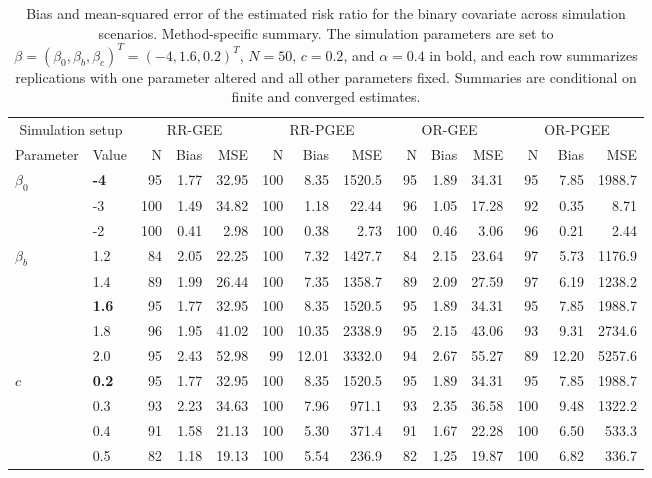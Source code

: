 \begin{table}[htbp]
\centering
\scriptsize
\setlength{\tabcolsep}{4pt}
\renewcommand{\arraystretch}{1.15}
\caption{Bias and mean-squared error of the estimated risk ratio for the binary covariate across simulation scenarios. Method-specific summary. The simulation parameters are set to $\beta = (\beta_0, \beta_b, \beta_c)^T = (-4, 1.6, 0.2)^T$, $N = 50$, $c = 0.2$, and $\alpha = 0.4$ in bold, and each row summarizes replications with one parameter altered and all other parameters fixed. Summaries are conditional on finite and converged estimates.}
\begin{tabular}{ll|rrr|rrr|rrr|rrr}
\hline
\multicolumn{2}{c|}{Simulation setup} & \multicolumn{3}{c|}{RR-GEE} & \multicolumn{3}{c|}{RR-PGEE} & \multicolumn{3}{c|}{OR-GEE} & \multicolumn{3}{c}{OR-PGEE} \\
Parameter & Value & N & Bias & MSE & N & Bias & MSE & N & Bias & MSE & N & Bias & MSE \\
\hline
$\beta_0$ & \textbf{-4} & 95 & 1.77 & 32.95 & 100 & 8.35 & 1520.5 & 95 & 1.89 & 34.31 & 95 & 7.85 & 1988.7 \\
 & -3 & 100 & 1.49 & 34.82 & 100 & 1.18 & 22.44 & 96 & 1.05 & 17.28 & 92 & 0.35 & 8.71 \\
 & -2 & 100 & 0.41 & 2.98 & 100 & 0.38 & 2.73 & 100 & 0.46 & 3.06 & 96 & 0.21 & 2.44 \\
\hline
$\beta_b$ & 1.2 & 84 & 2.05 & 22.25 & 100 & 7.32 & 1427.7 & 84 & 2.15 & 23.64 & 97 & 5.73 & 1176.9 \\
 & 1.4 & 89 & 1.99 & 26.44 & 100 & 7.35 & 1358.7 & 89 & 2.09 & 27.59 & 97 & 6.19 & 1238.2 \\
 & \textbf{1.6} & 95 & 1.77 & 32.95 & 100 & 8.35 & 1520.5 & 95 & 1.89 & 34.31 & 95 & 7.85 & 1988.7 \\
 & 1.8 & 96 & 1.95 & 41.02 & 100 & 10.35 & 2338.9 & 95 & 2.15 & 43.06 & 93 & 9.31 & 2734.6 \\
 & 2.0 & 95 & 2.43 & 52.98 & 99 & 12.01 & 3332.0 & 94 & 2.67 & 55.27 & 89 & 12.20 & 5257.6 \\
\hline
$c$ & \textbf{0.2} & 95 & 1.77 & 32.95 & 100 & 8.35 & 1520.5 & 95 & 1.89 & 34.31 & 95 & 7.85 & 1988.7 \\
 & 0.3 & 93 & 2.23 & 34.63 & 100 & 7.96 & 971.1 & 93 & 2.35 & 36.58 & 100 & 9.48 & 1322.2 \\
 & 0.4 & 91 & 1.58 & 21.13 & 100 & 5.30 & 371.4 & 91 & 1.67 & 22.28 & 100 & 6.50 & 533.3 \\
 & 0.5 & 82 & 1.18 & 19.13 & 100 & 5.54 & 236.9 & 82 & 1.25 & 19.87 & 100 & 6.82 & 336.7 \\

\end{tabular}
\end{table}
